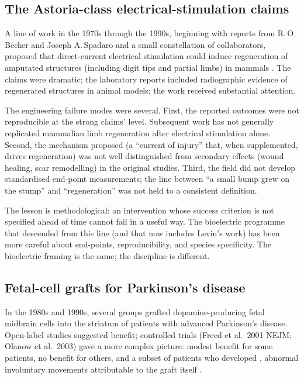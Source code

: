 \subsection{The Astoria-class electrical-stimulation claims}

A line of work in the 1970s through the 1990s, beginning with reports
from R.\,O.\,Becker and Joseph A.\,Spadaro and a small constellation of
collaborators, proposed that direct-current electrical stimulation
could induce regeneration of amputated structures (including digit
tips and partial limbs) in mammals
\cite{paper:v6c13-becker-currents-1972,
paper:v6c13-spadaro-bone-1974}. The claims were dramatic; the
laboratory reports included radiographic evidence of regenerated
structures in animal models; the work received substantial attention.

The engineering failure modes were several. First, the reported
outcomes were not reproducible at the strong claims' level. Subsequent
work has not generally replicated mammalian limb regeneration after
electrical stimulation alone. Second, the mechanism proposed (a
``current of injury'' that, when supplemented, drives regeneration)
was not well distinguished from secondary effects (wound healing, scar
remodelling) in the original studies. Third, the field did not develop
standardised end-point measurements; the line between ``a small bump
grew on the stump'' and ``regeneration'' was not held to a consistent
definition.

The lesson is methodological: an intervention whose success criterion
is not specified ahead of time cannot fail in a useful way. The
bioelectric programme that descended from this line (and that now
includes Levin's work) has been more careful about end-points,
reproducibility, and species specificity. The bioelectric framing is
the same; the discipline is different.

\subsection{Fetal-cell grafts for Parkinson's disease}

In the 1980s and 1990s, several groups grafted dopamine-producing fetal
midbrain cells into the striatum of patients with advanced Parkinson's
disease. Open-label studies suggested benefit; controlled trials
(Freed et al.\ 2001 NEJM; Olanow et al.\ 2003) gave a more complex
picture: modest benefit for some patients, no benefit for others, and
a subset of patients who developed ,
abnormal involuntary movements attributable to the graft itself
\cite{paper:v6c13-freed-fetal-parkinson-2001,
paper:v6c13-olanow-fetal-parkinson-2003}.

